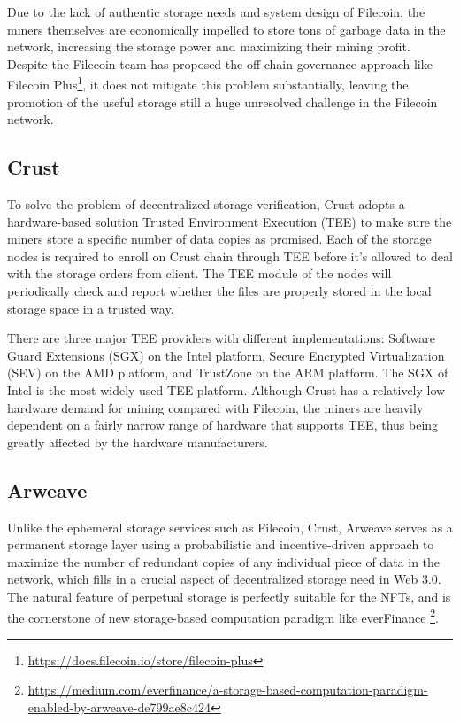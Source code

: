 \documentclass[]{article}
\begin{document}
Due to the lack of authentic storage needs and system design of Filecoin, the miners themselves are economically impelled to store tons of garbage data in the network, increasing the storage power and maximizing their mining profit. Despite the Filecoin team has proposed the off-chain governance approach like Filecoin Plus\footnote{\url{https://docs.filecoin.io/store/filecoin-plus}}, it does not mitigate this problem substantially, leaving the promotion of the useful storage still a huge unresolved challenge in the Filecoin network.

\subsection{Crust}

To solve the problem of decentralized storage verification, Crust\cite{ref2} adopts a hardware-based solution Trusted Environment Execution (TEE) to make sure the miners store a specific number of data copies as promised. Each of the storage nodes is required to enroll on Crust chain through TEE before it's allowed to deal with the storage orders from client. The TEE module of the nodes will periodically check and report whether the files are properly stored in the local storage space in a trusted way.

There are three major TEE providers with different implementations: Software Guard Extensions (SGX) on the Intel platform, Secure Encrypted Virtualization (SEV) on the AMD platform, and TrustZone on the ARM platform. The SGX of Intel is the most widely used TEE platform. Although Crust has a relatively low hardware demand for mining compared with Filecoin, the miners are heavily dependent on a fairly narrow range of hardware that supports TEE, thus being greatly affected by the hardware manufacturers.

\subsection{Arweave}

Unlike the ephemeral storage services such as Filecoin, Crust, Arweave\cite{ref3} serves as a permanent storage layer using a probabilistic and incentive-driven approach to maximize the number of redundant copies of any individual piece of data in the network, which fills in a crucial aspect of decentralized storage need in Web 3.0. The natural feature of perpetual storage is perfectly suitable for the NFTs, and is the cornerstone of new storage-based computation paradigm like everFinance \footnote{\url{https://medium.com/everfinance/a-storage-based-computation-paradigm-enabled-by-arweave-de799ae8c424}}.
\end{document}
